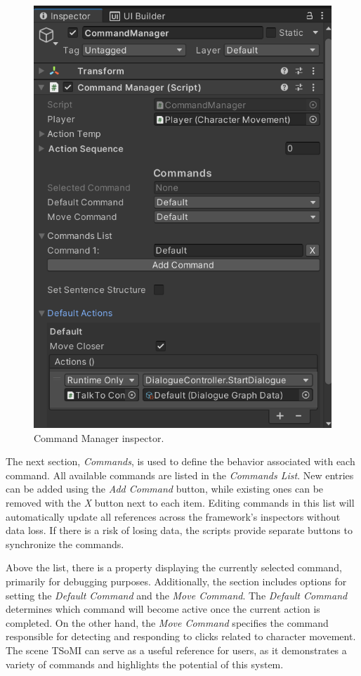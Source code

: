 \begin{figure}[H]
\centering
\includegraphics[width=.7\linewidth]{img/User doc/command_manager.png}
\caption{Command Manager inspector.}
\label{fig:Manual-CM}
\end{figure}

The next section, \textit{Commands}, is used to define the behavior associated with each command. All available commands are listed in the \textit{Commands List}. New entries can be added using the \textit{Add Command} button, while existing ones can be removed with the \textit{X} button next to each item. Editing commands in this list will automatically update all references across the framework’s inspectors without data loss. If there is a risk of losing data, the scripts provide separate buttons to synchronize the commands.

Above the list, there is a property displaying the currently selected command, primarily for debugging purposes. Additionally, the section includes options for setting the \textit{Default Command} and the \textit{Move Command}. The \textit{Default Command} determines which command will become active once the current action is completed. On the other hand, the \textit{Move Command} specifies the command responsible for detecting and responding to clicks related to character movement. The scene TSoMI can serve as a useful reference for users, as it demonstrates a variety of commands and highlights the potential of this system.

